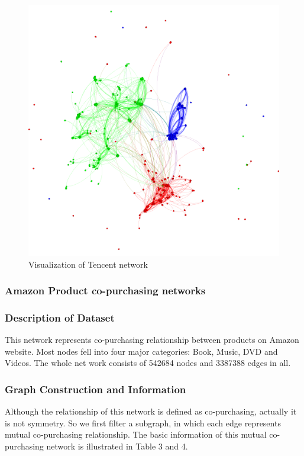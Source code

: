 \begin{figure}[!ht]
	\centering
	\begin{minipage}[b]{0.5\linewidth}
	\centering
	\includegraphics[width=\textwidth]{FIG/tencent.png}
	\caption{Visualization of Tencent network}
	\label{fig:figure2}
	\end{minipage}
\end{figure}

\subsubsection{Amazon Product co-purchasing networks}

\subsubsection*{Description of Dataset}
This network represents co-purchasing relationship between products on Amazon website. Most nodes fell into four major categories: Book, Music, DVD and Videos. The whole net work consists of 542684 nodes and 3387388 edges in all.


\subsubsection*{Graph Construction and Information}
Although the relationship of this network is defined as co-purchasing, actually it is not symmetry. So we first filter a subgraph, in which each edge represents mutual co-purchasing relationship. The basic information of this mutual co-purchasing network is illustrated in Table 3 and 4. 

